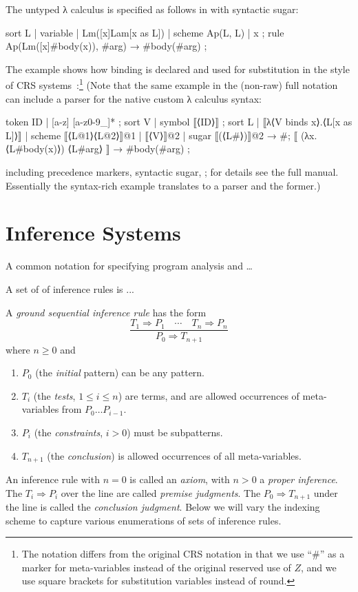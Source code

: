 \documentclass[letterpaper,11pt]{article}
\begin{document}
\begin{example}
  The untyped λ calculus is specified as follows in \hax with syntactic sugar:
  \begin{hacs}
    sort L | variable | Lm([x]Lam[x as L]) | scheme Ap(L, L) | x ;
    rule Ap(Lm([x]#body(x)), #arg) →  #body(#arg) ;
  \end{hacs}
  The example shows how binding is declared and used for substitution in the style of CRS
  systems~\cite{Klop+:tcs1993}:\footnote{The notation differs from the original CRS notation in that
    we use ``\#'' as a marker for meta-variables instead of the original reserved use of $Z$, and we
    use square brackets for substitution variables instead of round.}
  (Note that the same example in the (non-raw) full \HAX notation can include a parser for the
  native custom λ calculus syntax:
  \begin{hacs}
    token ID | [a-z] [a-z0-9_]* ;
    sort V | symbol ⟦⟨ID⟩⟧ ;
    sort L | ⟦λ⟨V binds x⟩.⟨L[x as L]⟩⟧ | scheme ⟦⟨L@1⟩⟨L@2⟩⟧@1
           | ⟦⟨V⟩⟧@2 | sugar ⟦(⟨L#⟩)⟧@2 →  #;
    ⟦ (λx.⟨L#body(x)⟩) ⟨L#arg⟩ ⟧ →  #body(#arg) ;
  \end{hacs}
  including precedence markers, syntactic sugar, \etc; for details see the full \HAX
  manual. Essentially the syntax-rich example translates to a parser and the former.)
\end{example}

\section{Inference Systems}
\label{sec:infer}

A common notation for specifying program analysis and …

A set of of inference rules is ...

\begin{definition}
  A \HAX \emph{ground sequential inference rule} has the form
  \begin{equation}
    \dfrac{ T_1 ⇒ P_1 \quad\cdots\quad T_n ⇒ P_n }{ P_0 ⇒ T_{n+1} }
    \label{eq:infer}
  \end{equation}
  where $n≥0$ and
  \begin{enumerate}
  \item $P_0$ (the \emph{initial} pattern) can be any \HAX pattern.
  \item $T_i$ (the \emph{tests}, $1≤i≤n$) are \HAX terms, and are allowed occurrences of meta-variables from $P_0…P_{i-1}$.
  \item $P_i$ (the \emph{constraints}, $i>0$) must be \HAX subpatterns.
  \item $T_{n+1}$ (the \emph{conclusion}) is allowed occurrences of all meta-variables.
  \end{enumerate}
  An inference rule with $n=0$ is called an \emph{axiom}, with $n>0$ a \emph{proper inference}.
  The $T_i⇒P_i$ over the line are called \emph{premise judgments}. The $P_0⇒T_{n+1}$ under the line
  is called the \emph{conclusion judgment}.
  Below we will vary the indexing scheme to capture various enumerations of sets of inference rules.
\end{definition}
\end{document}
